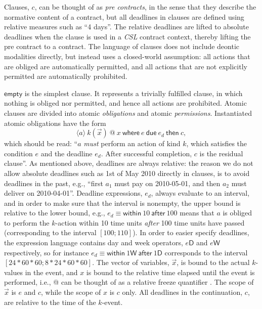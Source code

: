 \documentclass[orivec,final]{llncs-href}
\makeatletter
\newcommand{\csl}{\textit{CSL}}
\newcommand{\cempty}{\mathsf{empty}}
\newcommand{\catomic}[6]{\langle#1\rangle\ #2\ \textsf{@}\ #3\
  \mathsf{where}\ #4\ \mathsf{due}\ #5\ \mathsf{then}\ #6}
\newcommand{\cwithinafter}[2]{\mathsf{within}\ #1\ \mathsf{after}\ #2}
\makeatother
\begin{document}
Clauses, $c$, can be thought of as \emph{pre contracts}, in the sense
that they describe the normative content of a contract, but all
deadlines in clauses are defined using relative measures such as ``4
days''. The relative deadlines are lifted to absolute deadlines when
the clause is used in a \csl{} contract context, thereby lifting the
pre contract to a contract. The language 
of clauses does not include deontic modalities directly, but instead uses
a closed-world assumption: all actions that are obliged are
automatically permitted, and all actions that are not explicitly
permitted are automatically prohibited.

$\cempty$ is the simplest clause. It represents a trivially
fulfilled clause, in which nothing is obliged nor permitted, and hence 
all actions are prohibited. Atomic clauses are divided into atomic
\emph{obligations} and atomic \emph{permissions}. Instantiated atomic
obligations have the form
\[
\catomic{a}{k(\vec{x})}{x}{e}{e_d}{c},
\]
which should be read: ``$a$ \emph{must} perform an action of kind $k$,
which satisfies the condition $e$ and the deadline $e_d$. After
successful completion, $c$ is the residual clause''. As mentioned
above, deadlines are always relative: the reason we do not allow
absolute deadlines such as 1st of May 2010 directly in clauses, is to
avoid deadlines in the past, e.g., ``first $a_1$ must pay on
2010-05-01, and then $a_2$ must deliver on 2010-04-01''. Deadline
expressions, $e_d$, always evaluate to an interval, and in order to
make sure that the interval is nonempty, the upper bound is relative
to the lower bound, e.g., $e_d \equiv \cwithinafter{10}{100}$ means
that $a$ is obliged to perform the $k$-action within 10 time units
\emph{after} 100 time units have passed (corresponding to the interval
$[100;110]$). In order to easier specify deadlines, the expression
language contains day and week operators, $e\textsf{D}$ and
$e\textsf{W}$ respectively, so for instance $e_d \equiv
\cwithinafter{1\textsf{W}}{1\textsf{D}}$ corresponds to the interval
$[24*60*60;8*24*60*60]$.
The vector of variables, $\vec{x}$, is bound to 
the actual $k$-values in the event, and $x$ is bound to the relative
time elapsed until the event is performed, i.e., \textsf{@} can be
thought of as a relative freeze quantifier \cite{alur94tptl}. The
scope of $\vec{x}$ is $e$ and $c$, while the scope of $x$ is $c$
only. All deadlines in the continuation, $c$, are relative to the time
of the $k$-event.
\end{document}
